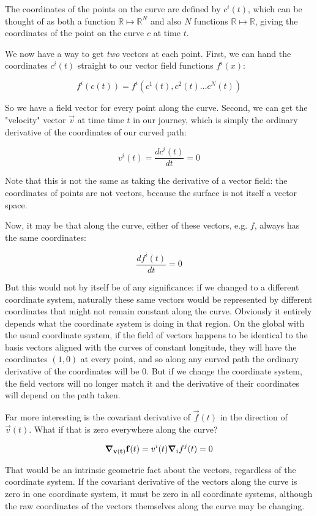 The coordinates of the points on the curve are defined by $c^i(t)$, which can be thought of as both a function $\mathbb{R} \mapsto \mathbb{R}^N$ and also $N$ functions $\mathbb{R} \mapsto \mathbb{R}$, giving the coordinates of the point on the curve $c$ at time $t$.

We now have a way to get \textit{two} vectors at each point. First, we can hand the coordinates $c^i(t)$ straight to our vector field functions $f^i(x)$:

$$
f^i(c(t)) = f^i(c^1(t), c^2(t) \dots c^N(t))
$$

So we have a field vector for every point along the curve. Second, we can get the "velocity" vector $\vec{v}$ at time time $t$ in our journey, which is simply the ordinary derivative of the coordinates of our curved path:

$$
v^i(t) = \frac{d c^i(t)}{dt} = 0
$$

Note that this is not the same as taking the derivative of a vector field: the coordinates of points are not vectors, because the surface is not itself a vector space.

Now, it may be that along the curve, either of these vectors, e.g. $f$, always has the same coordinates:

$$
\frac{d f^i(t)}{dt} = 0
$$

But this would not by itself be of any significance: if we changed to a different coordinate system, naturally these same vectors would be represented by different coordinates that might not remain constant along the curve. Obviously it entirely depends what the coordinate system is doing in that region. On the global with the usual coordinate system, if the field of vectors happens to be identical to the basis vectors aligned with the curves of constant longitude, they will have the coordinates $(1, 0)$ at every point, and so along any curved path the ordinary derivative of the coordinates will be $0$. But if we change the coordinate system, the field vectors will no longer match it and the derivative of their coordinates will depend on the path taken.

Far more interesting is the covariant derivative of $\vec{f}(t)$ in the direction of $\vec{v}(t)$. What if that is zero everywhere along the curve?

$$
\grad_{\mathbf{v(t)}} \mathbf{f}(t)
=
v^i(t) \grad_i f^j(t) = 0
$$

That would be an intrinsic geometric fact about the vectors, regardless of the coordinate system. If the covariant derivative of the vectors along the curve is zero in one coordinate system, it must be zero in all coordinate systems, although the raw coordinates of the vectors themselves along the curve may be changing.

